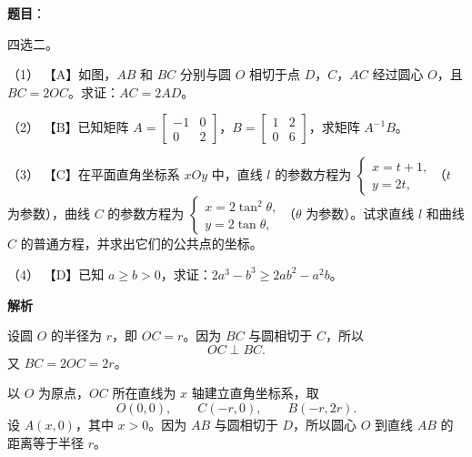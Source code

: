 \begin{answer}

\textbf{题目}：

四选二。

（1） 【A】如图，$AB$ 和 $BC$ 分别与圆 $O$ 相切于点 $D$，$C$，$AC$ 经过圆心 $O$，且 $BC=2OC$。求证：$AC=2AD$。
\nopagebreak[4]
\begin{center}\end{center}
\nopagebreak[4]
（2） 【B】已知矩阵 $A=\begin{bmatrix}-1&0\\0&2\end{bmatrix}$，$B=\begin{bmatrix}1&2\\0&6\end{bmatrix}$，求矩阵 $A^{-1}B$。

（3） 【C】在平面直角坐标系 $xOy$ 中，直线 $l$ 的参数方程为 $\begin{cases}x=t+1,\\y=2t,\end{cases}$（$t$ 为参数），曲线 $C$ 的参数方程为 $\begin{cases}x=2\tan^2\theta,\\y=2\tan\theta,\end{cases}$（$\theta$ 为参数）。试求直线 $l$ 和曲线 $C$ 的普通方程，并求出它们的公共点的坐标。

（4） 【D】已知 $a\geqslant b>0$，求证：$2a^3-b^3\geqslant2ab^2-a^2b$。

\textbf{解析}

设圆 $O$ 的半径为 $r$，即 $OC=r$。因为 $BC$ 与圆相切于 $C$，所以
\nopagebreak[4]
\[OC\perp BC.\]
又 $BC=2OC=2r$。

以 $O$ 为原点，$OC$ 所在直线为 $x$ 轴建立直角坐标系，取
\nopagebreak[4]
\[O(0,0),\qquad C(-r,0),\qquad B(-r,2r).\]
设 $A(x,0)$，其中 $x>0$。因为 $AB$ 与圆相切于 $D$，所以圆心 $O$ 到直线 $AB$ 的距离等于半径 $r$。


\end{answer}
